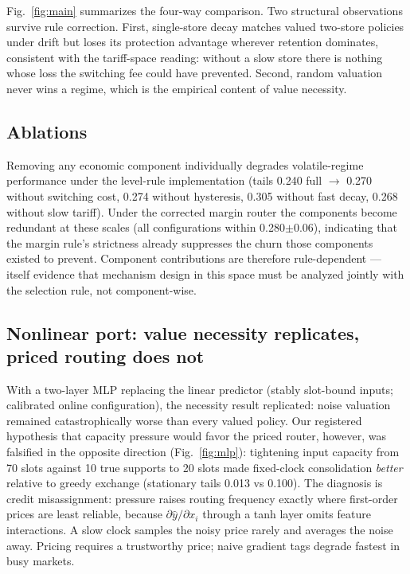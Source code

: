 \documentclass[11pt]{article}
\begin{document}
Fig.~\ref{fig:main} summarizes the four-way comparison. Two structural observations survive rule
correction. First, single-store decay matches valued two-store policies under drift but loses its
protection advantage wherever retention dominates, consistent with the tariff-space reading: without a
slow store there is nothing whose loss the switching fee could have prevented. Second, random valuation
never wins a regime, which is the empirical content of value necessity.

\subsection{Ablations}
Removing any economic component individually degrades volatile-regime performance under the level-rule
implementation (tails 0.240 full $\to$ 0.270 without switching cost, 0.274 without hysteresis, 0.305
without fast decay, 0.268 without slow tariff). Under the corrected margin router the components become
redundant at these scales (all configurations within 0.280$\pm$0.06), indicating that the margin rule's
strictness already suppresses the churn those components existed to prevent. Component contributions
are therefore rule-dependent --- itself evidence that mechanism design in this space must be analyzed
jointly with the selection rule, not component-wise.

\subsection{Nonlinear port: value necessity replicates, priced routing does not}
\label{sec:nnport}
With a two-layer MLP replacing the linear predictor (stably slot-bound inputs; calibrated online
configuration), the necessity result replicated: noise valuation remained catastrophically worse than
every valued policy. Our registered hypothesis that capacity pressure would favor the priced router,
however, was falsified in the opposite direction (Fig.~\ref{fig:mlp}): tightening input capacity from
70 slots against 10 true supports to 20 slots made fixed-clock consolidation \emph{better} relative to
greedy exchange (stationary tails 0.013 vs 0.100). The diagnosis is credit misassignment: pressure
raises routing frequency exactly where first-order prices are least reliable, because
$\partial\hat y/\partial x_i$ through a tanh layer omits feature interactions. A slow clock samples the
noisy price rarely and averages the noise away. Pricing requires a trustworthy price; naive gradient
tags degrade fastest in busy markets.
\end{document}
